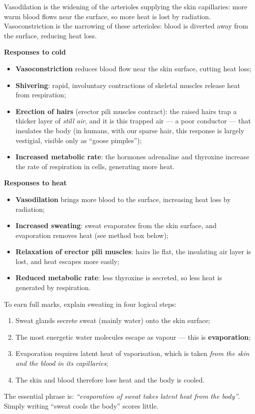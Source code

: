 \documentclass[11pt]{article}
\newcommand{\cle}[1]{{\popxbold\color{popdark}#1}}
\begin{document}
\begin{definition}
\cle{Vasodilation} is the widening of the arterioles supplying the skin capillaries: more warm blood flows near the surface, so more heat is lost by radiation. \cle{Vasoconstriction} is the narrowing of these arterioles: blood is diverted away from the surface, reducing heat loss.
\end{definition}

\textbf{Responses to cold}\par
\begin{itemize}
\item \textbf{Vasoconstriction} reduces blood flow near the skin surface, cutting heat loss;
\item \textbf{Shivering}: rapid, involuntary contractions of skeletal muscles release heat from respiration;
\item \textbf{Erection of hairs} (erector pili muscles contract): the raised hairs trap a thicker layer of \emph{still air}, and it is this trapped air — a poor conductor — that insulates the body (in humans, with our sparse hair, this response is largely vestigial, visible only as ``goose pimples'');
\item \textbf{Increased metabolic rate}: the hormones \cle{adrenaline} and \cle{thyroxine} increase the rate of respiration in cells, generating more heat.
\end{itemize}

\textbf{Responses to heat}\par
\begin{itemize}
\item \textbf{Vasodilation} brings more blood to the surface, increasing heat loss by radiation;
\item \textbf{Increased sweating}: sweat evaporates from the skin surface, and evaporation removes heat (see method box below);
\item \textbf{Relaxation of erector pili muscles}: hairs lie flat, the insulating air layer is lost, and heat escapes more easily;
\item \textbf{Reduced metabolic rate}: less thyroxine is secreted, so less heat is generated by respiration.
\end{itemize}

\begin{methode}
To earn full marks, explain sweating in four logical steps:
\begin{enumerate}
\item Sweat glands secrete sweat (mainly water) onto the skin surface;
\item The most energetic water molecules escape as vapour — this is \textbf{evaporation};
\item Evaporation requires \cle{latent heat of vaporisation}, which is taken \emph{from the skin and the blood in its capillaries};
\item The skin and blood therefore lose heat and the body is cooled.
\end{enumerate}
The essential phrase is: \emph{``evaporation of sweat takes latent heat from the body''}. Simply writing ``sweat cools the body'' scores little.
\end{methode}
\end{document}
